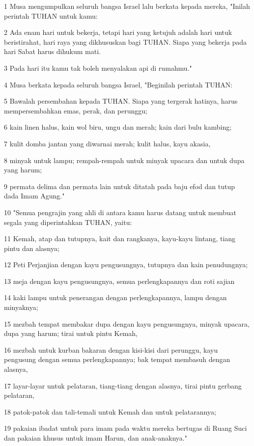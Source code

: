 \par 1 Musa mengumpulkan seluruh bangsa Israel lalu berkata kepada mereka, "Inilah perintah TUHAN untuk kamu:
\par 2 Ada enam hari untuk bekerja, tetapi hari yang ketujuh adalah hari untuk beristirahat, hari raya yang dikhususkan bagi TUHAN. Siapa yang bekerja pada hari Sabat harus dihukum mati.
\par 3 Pada hari itu kamu tak boleh menyalakan api di rumahmu."
\par 4 Musa berkata kepada seluruh bangsa Israel, "Beginilah perintah TUHAN:
\par 5 Bawalah persembahan kepada TUHAN. Siapa yang tergerak hatinya, harus mempersembahkan emas, perak, dan perunggu;
\par 6 kain linen halus, kain wol biru, ungu dan merah; kain dari bulu kambing;
\par 7 kulit domba jantan yang diwarnai merah; kulit halus, kayu akasia,
\par 8 minyak untuk lampu; rempah-rempah untuk minyak upacara dan untuk dupa yang harum;
\par 9 permata delima dan permata lain untuk ditatah pada baju efod dan tutup dada Imam Agung."
\par 10 "Semua pengrajin yang ahli di antara kamu harus datang untuk membuat segala yang diperintahkan TUHAN, yaitu:
\par 11 Kemah, atap dan tutupnya, kait dan rangkanya, kayu-kayu lintang, tiang pintu dan alasnya;
\par 12 Peti Perjanjian dengan kayu pengusungnya, tutupnya dan kain penudungnya;
\par 13 meja dengan kayu pengusungnya, semua perlengkapannya dan roti sajian
\par 14 kaki lampu untuk penerangan dengan perlengkapannya, lampu dengan minyaknya;
\par 15 mezbah tempat membakar dupa dengan kayu pengusungnya, minyak upacara, dupa yang harum; tirai untuk pintu Kemah,
\par 16 mezbah untuk kurban bakaran dengan kisi-kisi dari perunggu, kayu pengusung dengan semua perlengkapannya; bak tempat membasuh dengan alasnya,
\par 17 layar-layar untuk pelataran, tiang-tiang dengan alasnya, tirai pintu gerbang pelataran,
\par 18 patok-patok dan tali-temali untuk Kemah dan untuk pelatarannya;
\par 19 pakaian ibadat untuk para imam pada waktu mereka bertugas di Ruang Suci dan pakaian khusus untuk imam Harun, dan anak-anaknya."

